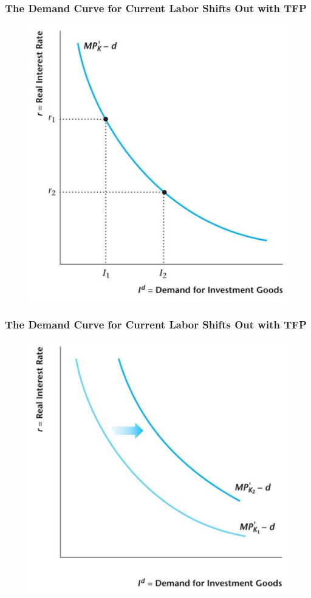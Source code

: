 \documentclass{beamer}
\begin{document}
\begin{frame}
\frametitle[alignment=center]{The Demand Curve for Current Labor Shifts Out with TFP}
\begin{figure}
\centering
\includegraphics[scale=0.6]{Figures/W_Fig_11pt9.png}
\end{figure}
\end{frame}

\begin{frame}
\frametitle[alignment=center]{The Demand Curve for Current Labor Shifts Out with TFP}
\begin{figure}
\centering
\includegraphics[scale=0.6]{Figures/W_Fig_11pt10.png}
\end{figure}
\end{frame}
\end{document}
